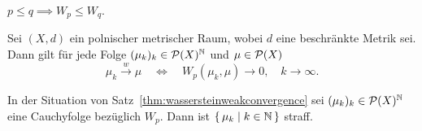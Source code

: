 \documentclass[../main/main.tex]{subfiles}
\begin{document}
	\begin{Bemerkung}
		$p \leq q \implies W_p \leq W_q$.
	\end{Bemerkung}

	\begin{Satz}
		\label{thm:wassersteinweakconvergence}
		Sei $(X, d)$ ein polnischer metrischer Raum, wobei $d$ eine beschränkte Metrik sei. Dann gilt
		für jede Folge $(\mu_k)_k \in \mathcal{P}(X)^{\mathbb{N}}$ und $\mu \in \mathcal{P}(X)$
		\[ \mu_k \xrightarrow{w} \mu \quad \iff \quad W_p(\mu_k, \mu) \to 0, \quad k \to \infty \text{.} \]
	\end{Satz}

	\begin{Hilfssatz}
		\label{lem:wassersteincauchyseq}
		In der Situation von Satz~\ref{thm:wassersteinweakconvergence} sei $(\mu_k)_k \in \mathcal{P}(X)^{\mathbb{N}}$ eine Cauchyfolge
		bezüglich $W_p$. Dann ist $\left\{\, \mu_k \; \middle| \; k \in \mathbb{N} \,\right\}$ straff.
	\end{Hilfssatz}
\end{document}
